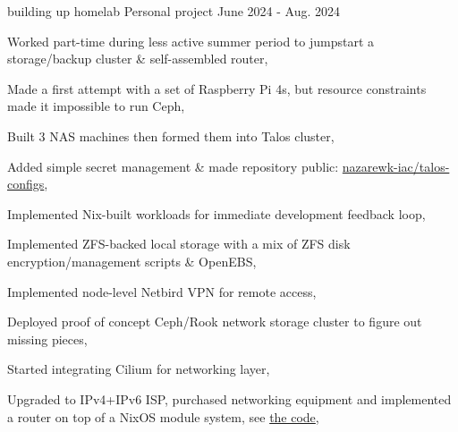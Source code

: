 \begin{cventries}
    \cventry
    {building up homelab} %
    {Personal project} %
    {} %
    {June 2024 - Aug. 2024} %
    {
        \begin{cvitems} %
            \item {Worked part-time during less active summer period to jumpstart a storage/backup cluster \& self-assembled router,}
            \item {Made a first attempt with a set of Raspberry Pi 4s, but resource constraints made it impossible to run Ceph,}
            \item {Built 3 NAS machines then formed them into Talos cluster,}
            \item {Added simple secret management \& made repository public: \href{https://github.com/nazarewk-iac/talos-configs}{nazarewk-iac/talos-configs},}
            \item {Implemented Nix-built workloads for immediate development feedback loop,}
            \item {Implemented ZFS-backed local storage with a mix of ZFS disk encryption/management scripts \& OpenEBS,}
            \item {Implemented node-level Netbird VPN for remote access,}
            \item {Deployed proof of concept Ceph/Rook network storage cluster to figure out missing pieces,}
            \item {Started integrating Cilium for networking layer,}
            \item {Upgraded to IPv4+IPv6 ISP, purchased networking equipment and implemented a router on top of a NixOS module system, see \href{https://github.com/nazarewk-iac/nix-configs/blob/9c4bee27ef4fa850334c60b9c4fc030773ea5220/modules/networking/router/README.md}{the code},}
        \end{cvitems}
    }


\end{cventries}
